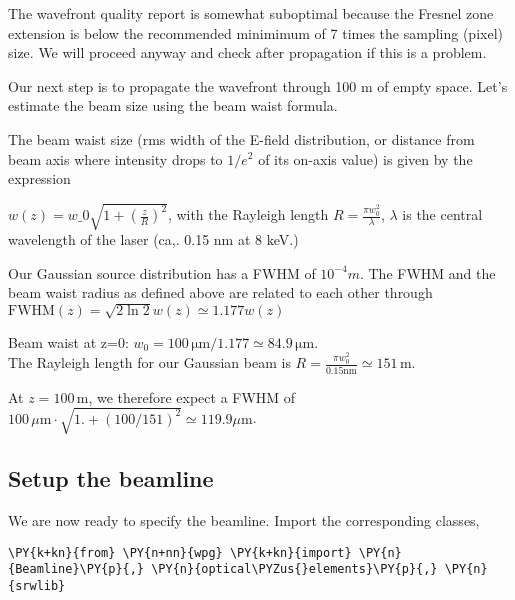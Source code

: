     The wavefront quality report is somewhat suboptimal because the Fresnel
zone extension is below the recommended minimimum of 7 times the
sampling (pixel) size. We will proceed anyway and check after
propagation if this is a problem.

Our next step is to propagate the wavefront through 100 m of empty
space. Let's estimate the beam size using the beam waist formula.

    The beam waist size (rms width of the E-field distribution, or distance
from beam axis where intensity drops to \(1/e^2\) of its on-axis value)
is given by the expression

\(w(z) = w\_0 \sqrt{1 + \left(\frac{z}{R}\right)^2}\), with the
Rayleigh length \(R = \frac{\pi w_0^2}{\lambda}\), \(\lambda\) is the
central wavelength of the laser (ca,. 0.15 nm at 8 keV.)

Our Gaussian source distribution has a FWHM of \(10^{-4} m\). The FWHM
and the beam waist radius as defined above are related to each other
through \(\mathrm{FWHM}(z) = \sqrt{2 \ln 2} w(z) \simeq 1.177 w(z)\)

Beam waist at z=0:
\(w_0 = 100\,\mathrm{\mu m} / 1.177 \simeq 84.9\,\mathrm{\mu m}\).\\
The Rayleigh length for our Gaussian beam is
\(R = \frac{\pi w_0^2}{0.15 \mathrm{nm}} \simeq 151\,\mathrm{m}\).

At \(z=100\,\mathrm{m}\), we therefore expect a FWHM of
\(100\,\mu\mathrm{m}\cdot\sqrt{1.+\left(100/151\right)^2} \simeq 119.9 \mu\mathrm{m}\).

    \hypertarget{setup-the-beamline}{%
\subsection{Setup the beamline}\label{setup-the-beamline}}

We are now ready to specify the beamline. Import the corresponding
classes,

    \begin{tcolorbox}[breakable, size=fbox, boxrule=1pt, pad at break*=1mm,colback=cellbackground, colframe=cellborder]
\begin{Verbatim}[commandchars=\\\{\}]
\PY{k+kn}{from} \PY{n+nn}{wpg} \PY{k+kn}{import} \PY{n}{Beamline}\PY{p}{,} \PY{n}{optical\PYZus{}elements}\PY{p}{,} \PY{n}{srwlib}
\end{Verbatim}
\end{tcolorbox}

